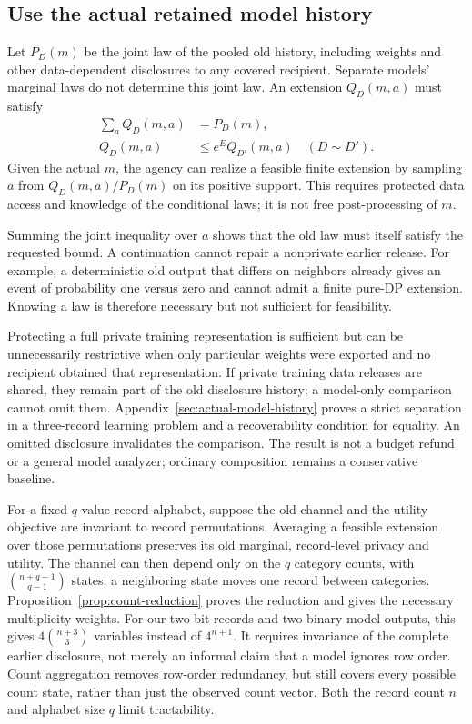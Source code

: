 \subsection{Use the actual retained model history}
\label{sec:weights-main}
Let $P_D(m)$ be the joint law of the pooled old history, including
weights and other data-dependent disclosures to any covered recipient.
Separate models' marginal laws do not determine this joint law.
An extension $Q_D(m,a)$
must satisfy
\[
 \begin{aligned}
 \sum_a Q_D(m,a)&=P_D(m),\\
 Q_D(m,a)&\le e^E Q_{D'}(m,a)\quad(D\sim D').
 \end{aligned}
\]
Given the actual $m$, the agency can realize a feasible finite extension
by sampling $a$ from $Q_D(m,a)/P_D(m)$ on its positive support. This
requires protected data access and knowledge of the conditional laws;
it is not free post-processing of $m$.

Summing the joint inequality over $a$ shows that the old law must itself
satisfy the requested bound. A continuation cannot repair a nonprivate
earlier release. For example, a deterministic old output that differs on
neighbors already gives an event of probability one versus zero and
cannot admit a finite pure-DP extension. Knowing a law is therefore
necessary but not sufficient for feasibility.

Protecting a full private training representation is sufficient but can
be unnecessarily restrictive when only particular weights were exported
and no recipient obtained that representation.
If private training data releases are shared, they remain part of the old
disclosure history; a model-only comparison cannot omit them.
Appendix~\ref{sec:actual-model-history} proves a strict separation in a
three-record learning problem and a recoverability condition for equality.
An omitted disclosure invalidates the comparison. The result is not a
budget refund or a general model analyzer; ordinary composition remains
a conservative baseline.

For a fixed $q$-value record alphabet, suppose the old channel and the
utility objective are invariant to record permutations. Averaging a
feasible extension over those permutations preserves its old marginal,
record-level privacy and utility. The channel can then depend only on
the $q$ category counts, with $\binom{n+q-1}{q-1}$ states; a neighboring
state moves one record between categories. Proposition~\ref{prop:count-reduction}
proves the reduction and gives the necessary multiplicity weights.
For our two-bit records and two binary model outputs, this gives
$4\binom{n+3}{3}$ variables instead of $4^{n+1}$.
It requires invariance of the complete earlier disclosure, not merely
an informal claim that a model ignores row order. Count aggregation
removes row-order redundancy, but still covers every possible count
state, rather than just the observed count vector. Both the record count
$n$ and alphabet size $q$ limit tractability.

